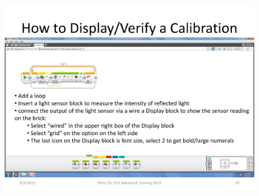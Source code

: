 \documentclass[11pt]{beamer}
\begin{document}
\begin{frame}
\begin{figure}
\includegraphics[scale=0.4]{ev3advanced2015/file-page10}
\end{figure}
\end{frame}
\end{document}
